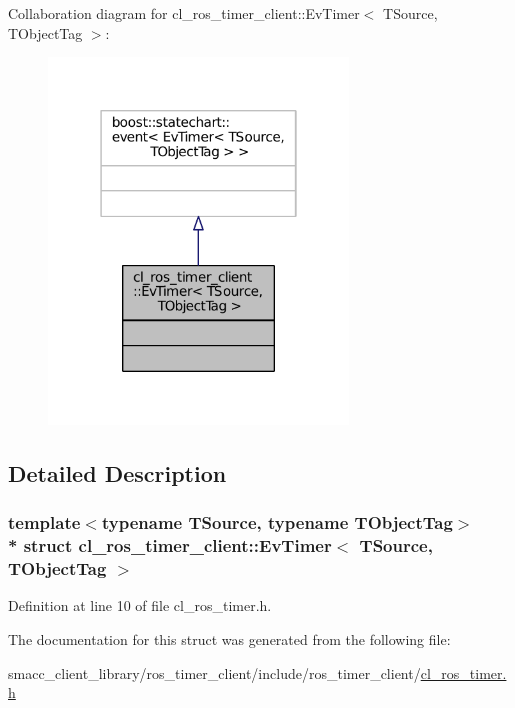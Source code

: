 Collaboration diagram for cl\+\_\+ros\+\_\+timer\+\_\+client\+:\+:Ev\+Timer$<$ T\+Source, T\+Object\+Tag $>$\+:
\nopagebreak
\begin{figure}[H]
\begin{center}
\leavevmode
\includegraphics[width=226pt]{structcl__ros__timer__client_1_1EvTimer__coll__graph}
\end{center}
\end{figure}


\subsection{Detailed Description}
\subsubsection*{template$<$typename T\+Source, typename T\+Object\+Tag$>$\\*
struct cl\+\_\+ros\+\_\+timer\+\_\+client\+::\+Ev\+Timer$<$ T\+Source, T\+Object\+Tag $>$}



Definition at line 10 of file cl\+\_\+ros\+\_\+timer.\+h.



The documentation for this struct was generated from the following file\+:\begin{DoxyCompactItemize}
\item 
smacc\+\_\+client\+\_\+library/ros\+\_\+timer\+\_\+client/include/ros\+\_\+timer\+\_\+client/\hyperlink{cl__ros__timer_8h}{cl\+\_\+ros\+\_\+timer.\+h}\end{DoxyCompactItemize}
